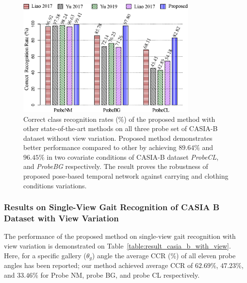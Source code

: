 \begin{figure}
	\centering
	\includegraphics[width = 0.8\textwidth]{figures/comp_casia_b_without_view.eps}
	\caption [] {
		Correct class recognition rates (\%) of the proposed method with other state-of-the-art methods on all three probe set of CASIA-B dataset without view variation. Proposed method demonstrates better performance compared to other by achieving $89.64\%$ and $96.45\%$ in two covariate conditions of CASIA-B dataset \textit{ProbeCL}, and \textit{ProbeBG} respectively. The result proves the robustness of proposed pose-based temporal network against carrying and clothing conditions variations.  \label{fig:comp_casia_b_without_view}
	}
\end{figure}


\subsubsection{Results on Single-View Gait Recognition of CASIA B Dataset with View Variation}
The performance of the proposed method on single-view gait recognition with view variation is demonstrated on Table~\ref{table:result_casia_b_with_view}. Here, for a specific gallery ($ \theta_g $) angle the average CCR (\%) of all eleven probe angles has been reported; our method achieved average CCR of $62.69\%$, $47.23\%$, and $33.46\%$ for Probe NM, probe BG, and probe CL respectively.


